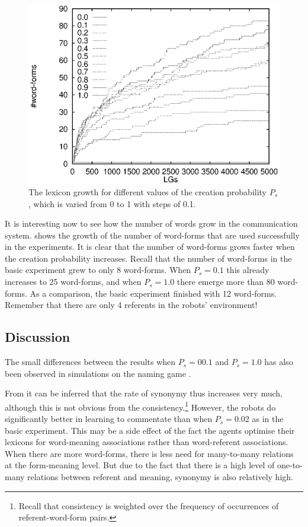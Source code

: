\begin{figure}[t]
\centerline{\includegraphics[width=12cm]{lexicon/words.eps}}
\caption{The lexicon growth for different values of the creation probability $P_s$, which is varied from 0 to 1 with steps of 0.1.}
\label{f:lex:words}
\end{figure}

It is interesting now to see how the number of words grow in the communication system.  shows the growth of the number of word-forms that are used successfully in the experiments. It is clear that the number of word-forms grows faster when the creation probability increases. Recall that the number of word-forms in the basic experiment grew to only 8 word-forms. When $P_s=0.1$ this already increases to 25 word-forms, and when $P_s=1.0$ there emerge more than 80 word-forms. As a comparison, the basic experiment finished with 12 word-forms. Remember that there are only 4 referents in the robots' environment!

\subsection{Discussion}

The small differences between the results when $P_s=00.1$ and $P_s=1.0$ has also been observed in simulations on the naming game \citep{kaplan:2000}.

From  it can be inferred that the rate of synonymy thus increases very much, although this is not obvious from the consistency.\footnote{Recall that consistency is weighted over the frequency of occurrences of referent-word-form pairs.} However, the robots do significantly better in learning to commentate than when $P_s=0.02$ as in the basic experiment. This may be a side effect of the fact the agents optimise their lexicons for word-meaning associations rather than word-referent associations. When there are more word-forms, there is less need for many-to-many relations at the form-meaning level. But due to the fact that there is a high level of one-to-many relations between referent and meaning, synonymy is also relatively high.

